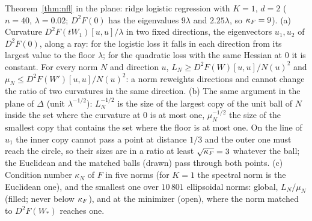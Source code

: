 \begin{explfigure}
\caption{Theorem~\ref{thm:nfl} in the plane: ridge logistic regression with $K=1$, $d=2$ ($n=40$, $\lambda=0.02$;
$D^2F(0)$ has the eigenvalues $9\lambda$ and $2.25\lambda$, so $\kF=9$). (a) Curvature $D^2F(tW_1)[u,u]/\lambda$ in two
fixed directions, the eigenvectors $u_1,u_2$ of $D^2F(0)$, along a ray: for the logistic loss it falls in each direction
from its largest value to the floor $\lambda$; for the quadratic loss with the same Hessian at $0$ it is constant. For
every norm $N$ and direction $u$, $L_N\ge D^2F(W)[u,u]/N(u)^2$ and $\mu_N\le D^2F(W')[u,u]/N(u)^2$: a norm reweights
directions and cannot change the ratio of two curvatures in the same direction. (b) The same argument in the plane of
$\Delta$ (unit $\lambda^{-1/2}$): $L_N^{-1/2}$ is the size of the largest copy of the unit ball of $N$ inside the set
where the curvature at $0$ is at most one, $\mu_N^{-1/2}$ the size of the smallest copy that contains the set where
the floor is at most one. On the line of $u_1$ the inner copy cannot pass a point at distance $1/3$ and the outer one
must reach the circle, so their sizes are in a ratio at least $\sqrt{\kF}=3$ whatever the ball; the Euclidean and the
matched balls (drawn) pass through both points. (c) Condition number $\kappa_N$ of $F$ in five norms (for $K=1$ the
spectral norm is the Euclidean one), and the smallest one over $10\,801$ ellipsoidal norms: global, $L_N/\mu_N$
(filled; never below $\kF$), and at the minimizer (open), where the norm matched to $D^2F(W_\ast)$ reaches
one.}\label{fig:nflplane}
\end{explfigure}

